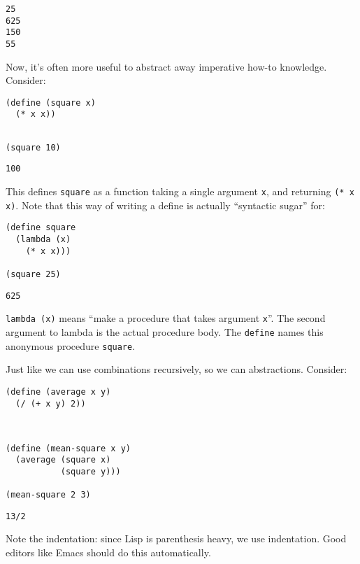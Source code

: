 \documentclass[9pt]{report}
\begin{document}
\begin{verbatim}
25
625
150
55
\end{verbatim}


Now, it's often more useful to abstract away imperative how-to
knowledge. Consider:

\begin{verbatim}
(define (square x)
  (* x x))
\end{verbatim}

\begin{verbatim}

(square 10)
\end{verbatim}

\begin{verbatim}
100
\end{verbatim}


This defines \texttt{square} as a function taking a single argument \texttt{x},
and returning \texttt{(* x x)}. Note that this way of writing a define is
actually ``syntactic sugar'' for:

\begin{verbatim}
(define square
  (lambda (x)
    (* x x)))

(square 25)
\end{verbatim}

\begin{verbatim}
625
\end{verbatim}


\texttt{lambda (x)} means ``make a procedure that takes argument \texttt{x}''. The
second argument to lambda is the actual procedure body. The
\texttt{define} names this anonymous procedure \texttt{square}.

Just like we can use combinations recursively, so we can
abstractions. Consider:

\begin{verbatim}
(define (average x y)
  (/ (+ x y) 2))
\end{verbatim}

\begin{verbatim}


(define (mean-square x y)
  (average (square x)
           (square y)))

(mean-square 2 3)
\end{verbatim}

\begin{verbatim}
13/2
\end{verbatim}


Note the indentation: since Lisp is parenthesis heavy, we use
indentation. Good editors like Emacs should do this automatically.
\end{document}
